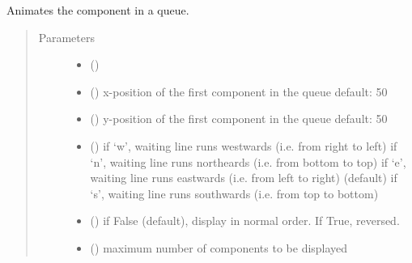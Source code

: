 \documentclass[letterpaper,10pt,english]{sphinxmanual}
\begin{document}

\begin{fulllineitems}
\label{\detokenize{Reference:salabim.AnimateQueue}}
Animates the component in a queue.
\begin{quote}\begin{description}
\item[{Parameters}] \leavevmode\begin{itemize}
\item {} 
 ({\hyperref[\detokenize{Reference:salabim.Queue}]{}}) \textendash{} 

\item {} 
 () \textendash{} x-position of the first component in the queue 
default: 50

\item {} 
 () \textendash{} y-position of the first component in the queue 
default: 50

\item {} 
 () \textendash{} if ‘w’, waiting line runs westwards (i.e. from right to left) 
if ‘n’, waiting line runs northeards (i.e. from bottom to top) 
if ‘e’, waiting line runs eastwards (i.e. from left to right) (default) 
if ‘s’, waiting line runs southwards (i.e. from top to bottom)

\item {} 
 () \textendash{} if False (default), display in normal order. If True, reversed.

\item {} 
 () \textendash{} maximum number of components to be displayed


\end{itemize}
\end{description}
\end{quote}
\end{fulllineitems}
\end{document}
